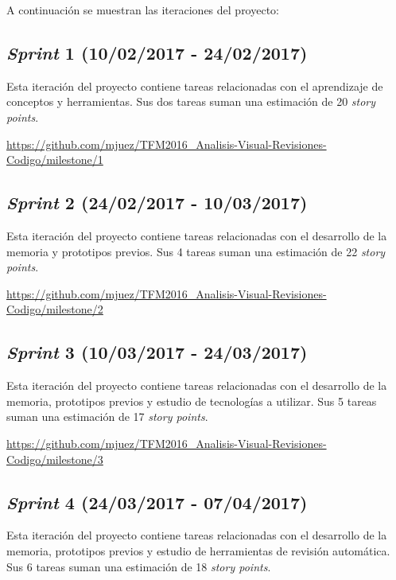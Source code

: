 A continuación se muestran las iteraciones del proyecto:

\subsection{\emph{Sprint} 1 (10/02/2017 - 24/02/2017)}

Esta iteración del proyecto contiene tareas relacionadas con el aprendizaje de conceptos y herramientas. Sus dos tareas suman una estimación de 20 \emph{story points}.

\url{https://github.com/mjuez/TFM2016_Analisis-Visual-Revisiones-Codigo/milestone/1}


\subsection{\emph{Sprint} 2 (24/02/2017 - 10/03/2017)}

Esta iteración del proyecto contiene tareas relacionadas con el desarrollo de la memoria y prototipos previos. Sus 4 tareas suman una estimación de 22 \emph{story points}.

\url{https://github.com/mjuez/TFM2016_Analisis-Visual-Revisiones-Codigo/milestone/2}


\subsection{\emph{Sprint} 3 (10/03/2017 - 24/03/2017)}

Esta iteración del proyecto contiene tareas relacionadas con el desarrollo de la memoria, prototipos previos y estudio de tecnologías a utilizar. Sus 5 tareas suman una estimación de 17 \emph{story points}.

\url{https://github.com/mjuez/TFM2016_Analisis-Visual-Revisiones-Codigo/milestone/3}


\subsection{\emph{Sprint} 4 (24/03/2017 - 07/04/2017)}

Esta iteración del proyecto contiene tareas relacionadas con el desarrollo de la memoria, prototipos previos y estudio de herramientas de revisión automática. Sus 6 tareas suman una estimación de 18 \emph{story points}.

